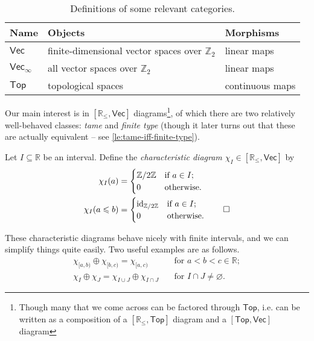 \documentclass[12pt]{article}
\numberwithin{equation}{subsection}
\numberwithin{theorem}{subsection}
\numberwithin{lemma}{subsection}
\numberwithin{corollary}{subsection}
\numberwithin{definition}{subsection}
\numberwithin{example}{subsection}
\numberwithin{note}{subsection}
\newcommand{\zz}{\mathbb{Z}}
\newcommand{\rr}{\mathbb{R}}
\newcommand{\rrleq}{\rr_\leqslant}
\newcommand{\Vecrrdiag}{[\rr_\leqslant,\mathsf{Vec}]}
\newcommand{\Top}{\mathsf{Top}}
\DeclareMathOperator{\id}{id}
\begin{document}
        \begin{table}[ht]
            \centering
            \begin{tabular}{lll}
                Name & Objects & Morphisms\\
                \toprule
                $\mathsf{Vec}$ & finite-dimensional vector spaces over $\zz_2$ & linear maps\\
                $\mathsf{Vec}_\infty$ & all vector spaces over $\zz_2$ & linear maps\\
                $\Top$ & topological spaces & continuous maps\qedhere
            \end{tabular}
            \caption{Definitions of some relevant categories.}\label{tb:useful-categories}
        \end{table}

        Our main interest is in $\Vecrrdiag$ diagrams\footnote{
            Though many that we come across can be factored through $\Top$, i.e. can be written as a composition of a $[\rrleq,\Top]$ diagram and a $[\Top,\mathsf{Vec}]$ diagram
        }, of which there are two relatively well-behaved classes: \emph{tame} and \emph{finite type} (though it later turns out that these are actually equivalent -- see \cref{le:tame-iff-finite-type}).

        \begin{definition}
            Let $I\subseteq\rr$ be an interval.
            Define the \emph{characteristic diagram $\chi_I\in\Vecrrdiag$} by
            \begin{align*}
                \chi_I(a)&=
                \begin{cases}
                    \zz/2\zz &\mbox{if }a\in I;\\
                    0 &\mbox{otherwise}.
                \end{cases}\\
                \chi_I(a\leqslant b)&=
                \begin{cases}
                    \id_{\zz/2\zz} &\mbox{if }a\in I;\\
                    0 &\mbox{otherwise}.
                \end{cases}\qedhere
            \end{align*}
        \end{definition}

        These characteristic diagrams behave nicely with finite intervals, and we can simplify things quite easily.
        Two useful examples are as follows.
        \begin{align}
            \chi_{[a,b)}\oplus\chi_{[b,c)}=\chi_{[a,c)}\quad&\text{for }a<b<c\in\rr;\label{eq:characteristic-diagram-reduction-1}\\
            \chi_I\oplus\chi_J=\chi_{I\cup J}\oplus\chi_{I\cap J}\quad&\text{for }I\cap J\neq\varnothing.\label{eq:characteristic-diagram-reduction-2}
        \end{align}
\end{document}
